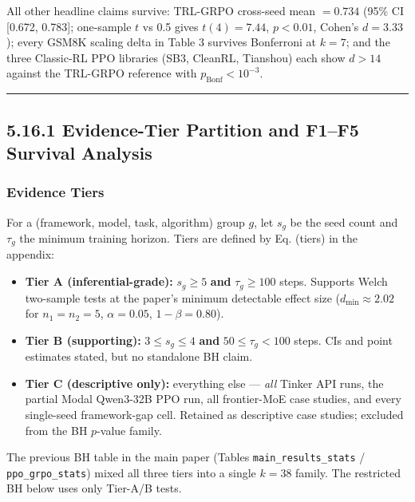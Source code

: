 \documentclass[
  american,
  11pt,
  a4paper,
  oneside]{report}
\providecommand{\tightlist}{%
  \setlength{\itemsep}{0pt}\setlength{\parskip}{0pt}}
\begin{document}
All other headline claims survive: TRL-GRPO cross-seed mean \(= 0.734\)
(95\% CI {[}0.672, 0.783{]}; one-sample \(t\) vs 0.5 gives
\(t(4) = 7.44\), \(p < 0.01\), Cohen's \(d = 3.33\)); every GSM8K
scaling delta in Table 3 survives Bonferroni at \(k = 7\); and the three
Classic-RL PPO libraries (SB3, CleanRL, Tianshou) each show \(d > 14\)
against the TRL-GRPO reference with \(p_{\text{Bonf}} < 10^{-3}\).

\begin{center}\rule{0.5\linewidth}{0.5pt}\end{center}

\subsection{5.16.1 Evidence-Tier Partition and F1--F5 Survival
Analysis}\label{evidence-tier-partition-and-f1f5-survival-analysis}

\subsubsection{Evidence Tiers}\label{evidence-tiers}

For a (framework, model, task, algorithm) group \(g\), let \(s_g\) be
the seed count and \(\tau_g\) the minimum training horizon. Tiers are
defined by Eq. (tiers) in the appendix:

\begin{itemize}
\tightlist
\item
  \textbf{Tier A (inferential-grade):} \(s_g \ge 5\) \textbf{and}
  \(\tau_g \ge 100\) steps. Supports Welch two-sample tests at the
  paper's minimum detectable effect size (\(d_{\min} \approx 2.02\) for
  \(n_1{=}n_2{=}5\), \(\alpha{=}0.05\), \(1-\beta{=}0.80\)).
\item
  \textbf{Tier B (supporting):} \(3 \le s_g \le 4\) \textbf{and}
  \(50 \le \tau_g < 100\) steps. CIs and point estimates stated, but no
  standalone BH claim.
\item
  \textbf{Tier C (descriptive only):} everything else --- \emph{all}
  Tinker API runs, the partial Modal Qwen3-32B PPO run, all frontier-MoE
  case studies, and every single-seed framework-gap cell. Retained as
  descriptive case studies; excluded from the BH \(p\)-value family.
\end{itemize}

The previous BH table in the main paper (Tables
\texttt{main\_results\_stats} / \texttt{ppo\_grpo\_stats}) mixed all
three tiers into a single \(k=38\) family. The restricted BH below uses
only Tier-A/B tests.
\end{document}
